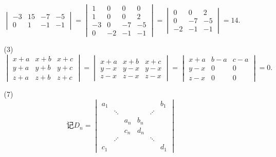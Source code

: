 \documentclass{article}
\begin{document}
\begin{enumerate}
\begin{enumerate}
\[\begin{vmatrix}
                -3& 15& -7& -5\\
                0& 1 & -1& -1
            \end{vmatrix}=
            \begin{vmatrix}
                1&  0 & 0 & 0\\
                1&  0 & 0 & 2\\
                -3& 0 & -7& -5\\
                0&  -2 & -1& -1
            \end{vmatrix}=
            \begin{vmatrix}
                0& 0& 2\\
                0& -7& -5\\
                -2& -1& -1
            \end{vmatrix}
            =14.
            \]       
        \item [(3)]
        \[
            \begin{vmatrix}
                x+a & x+b & x+c\\
                y+a & y+b & y+c\\
                z+a & z+b & z+c
            \end{vmatrix}=
            \begin{vmatrix}
                x+a & x+b & x+c\\
                y-x & y-x & y-x\\
                z-x & z-x & z-x
            \end{vmatrix}=
            \begin{vmatrix}
                x+a & b-a & c-a\\
                y-x & 0 & 0\\
                z-x & 0 & 0
            \end{vmatrix}=0.
        \]
        \item [(7)]
        \[
            \mbox{记}D_n=
            \begin{vmatrix}
                a_1 &        &     &     &        &b_1\\
                    & \ddots &     &     & \iddots &   \\
                    &        & a_n & b_n &        &   \\
                    &        & c_n & d_n &        &   \\
                    & \iddots &     &     & \ddots &   \\
                c_1 &        &     &     &        &d_1

\end{vmatrix}\]
\end{enumerate}
\end{enumerate}
\end{document}
